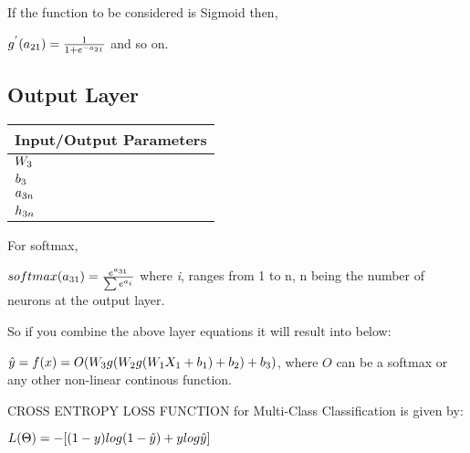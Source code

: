 \documentclass[
]{article}
\begin{document}
If the function to be considered is Sigmoid then,

\(\Large g^{'}(a_{21}) = \frac{1}{1+ e ^{-a_{21}}}\) and so on.

\hypertarget{header-n311}{%
\subsection{Output Layer}\label{header-n311}}

\begin{longtable}[]{@{}l@{}}
\toprule
Input/Output Parameters\tabularnewline
\midrule
\endhead
\(\large W_3\)\tabularnewline
\(\large b_3\) \tabularnewline
\(\large a_{3n}\)\tabularnewline
\(\large h_{3n}\)\tabularnewline
\bottomrule
\end{longtable}

For softmax,

\( \Large  softmax(a_{31})  = \LARGE \frac{e^{a_{31}}}{\sum e ^ {a_i}}\)
where \emph{i}, ranges from 1 to n, n being the number of neurons at the
output layer.

So if you combine the above layer equations it will result into below:

\(\large \hat{y} = f(x) = O(W_3g(W_2g(W_1X_1+b_1) + b_2)+ b_3)\), where
\(O\) can be a softmax or any other non-linear continous function.

CROSS ENTROPY LOSS FUNCTION for Multi-Class Classification is given by:

\(\large L(\Theta)  = -[(1-y)log(1 - \hat{y}) + ylog\hat{y}] \)
\end{document}

